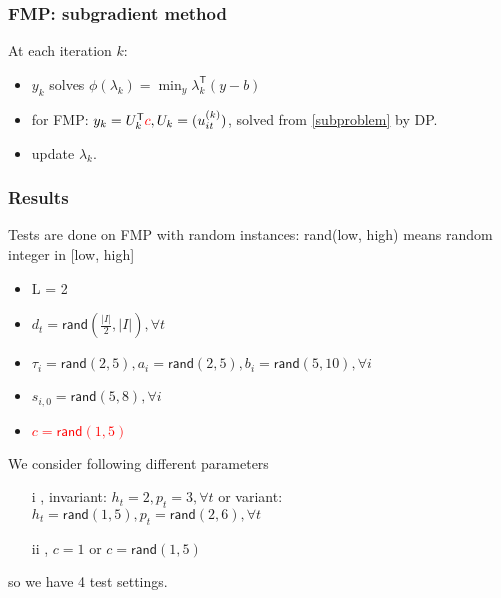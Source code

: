 \begin{frame}
  \frametitle{FMP: subgradient method}
  At each iteration \(k\):
  \begin{itemize}
    \item  \(y_k\) solves \(\phi(\lambda_k) = \min_y \lambda_k^\mathsf{T}(y-b)\)
    \item for FMP: \(y_k = U_k ^\mathsf{T} \textcolor{red}{c}, U_k = (u^{(k)}_{it})\), solved from \eqref{subproblem} by DP.
    \item update \(\lambda_k\).
  \end{itemize}
\end{frame}
\begin{frame}
  \frametitle{Results}

  Tests are done on FMP with random instances: rand(low, high) means random integer in [low, high]

  \begin{itemize}
    \item L = 2
    \item \(d_t= \textsf{rand}(\frac{|I|}{2}, |I|), \forall t\)
    \item \(\tau_i = \textsf{rand}(2, 5), a_i =  \textsf{rand}(2, 5),  b_i =  \textsf{rand}(5, 10), \forall i\)
    \item \(s_{i, 0} = \textsf{rand}(5, 8), \forall i\)
    \item \textcolor{red}{\(c = \textsf{rand}(1, 5)\)}
  \end{itemize}

  We consider following different parameters
  \begin{itemize}
    \item [i], invariant: \(h_t = 2, p_t = 3, \forall t\) or variant: \(h_t = \textsf{rand}(1, 5), p_t = \textsf{rand}(2, 6), \forall t\)
    \item [ii], \(c = 1\) or \(c = \textsf{rand}(1, 5)\)
  \end{itemize}

  so we have 4 test settings.
\end{frame}

